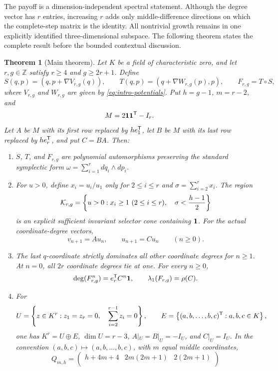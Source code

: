 \documentclass[11pt]{article}
\newtheorem{theorem}{Theorem}[section]
\theoremstyle{remark}
\numberwithin{equation}{section}
\begin{document}
The payoff is a dimension-independent spectral statement.  Although the
degree vector has \(r\) entries, increasing \(r\) adds only middle-difference
directions on which the complete-step matrix is the identity.  All
nontrivial growth remains in one explicitly identified three-dimensional
subspace.  The following theorem states the complete result before the
bounded contextual discussion.

\begin{theorem}[Main theorem]\label{thm:main}
Let \(K\) be a field of characteristic zero, and let \(r,g\in\mathbb Z\)
satisfy \(r\geq4\) and \(g\geq2r+1\).  Define
\[
S(q,p)=(q,p+\nabla V_{r,g}(q)),
\qquad
T(q,p)=(q+\nabla W_{r,g}(p),p),
\qquad
F_{r,g}=T\circ S,
\]
where \(V_{r,g}\) and \(W_{r,g}\) are given by
\eqref{eq:intro-potentials}.  Put \(h=g-1\), \(m=r-2\), and
\[
M=2\mathbf{1}\mathbf{1}^{\mathsf{T}}-I_r.
\]
Let \(A\) be \(M\) with its first row replaced by
\(he_1^{\mathsf{T}}\), let \(B\) be \(M\) with its last row replaced by
\(he_r^{\mathsf{T}}\), and put \(C=BA\).  Then:
\begin{enumerate}[label=\textup{(\roman*)}]
\item \(S\), \(T\), and \(F_{r,g}\) are polynomial automorphisms preserving
the standard symplectic form
\(\omega=\sum_{i=1}^{r}dq_i\wedge dp_i\).
\item For \(u>0\), define \(x_i=u_i/u_1\) only for \(2\leq i\leq r\) and
\(\sigma=\sum_{i=2}^{r}x_i\).  The region
\[
\mathcal{K}_{r,g}=
\left\{u>0:x_i\geq1\ (2\leq i\leq r),\quad
\sigma<\frac{h-1}{2}\right\}
\]
is an explicit sufficient invariant selector cone containing \(\mathbf{1}\).
For the actual coordinate-degree vectors,
\[
v_{n+1}=Au_n,
\qquad
u_{n+1}=Cu_n
\qquad(n\geq0).
\]
\item The last \(q\)-coordinate strictly dominates all other coordinate
degrees for \(n\geq1\).  At \(n=0\), all \(2r\) coordinate degrees tie at
one.  For every \(n\geq0\),
\begin{equation}\label{eq:main-degree}
\operatorname{deg}(F_{r,g}^n)=e_r^{\mathsf{T}}C^n\mathbf{1},
\qquad
\lambda_1(F_{r,g})=\rho(C).
\end{equation}
\item For
\[
U=\left\{z\in K^r:z_1=z_r=0,\quad
\sum_{i=2}^{r-1}z_i=0\right\},
\qquad
E=\left\{(a,b,\ldots,b,c)^{\mathsf{T}}:a,b,c\in K\right\},
\]
one has \(K^r=U\oplus E\), \(\dim U=r-3\),
\(A|_U=B|_U=-I_U\), and \(C|_U=I_U\).  In the convention
\((a,b,c)\mapsto(a,b,\ldots,b,c)\), with \(m\) equal middle coordinates,
\[
Q_{m,h}=
\begin{pmatrix}
h+4m+4 & 2m(2m+1) & 2(2m+1)\\

\end{pmatrix}\]
\end{enumerate}
\end{theorem}
\end{document}
